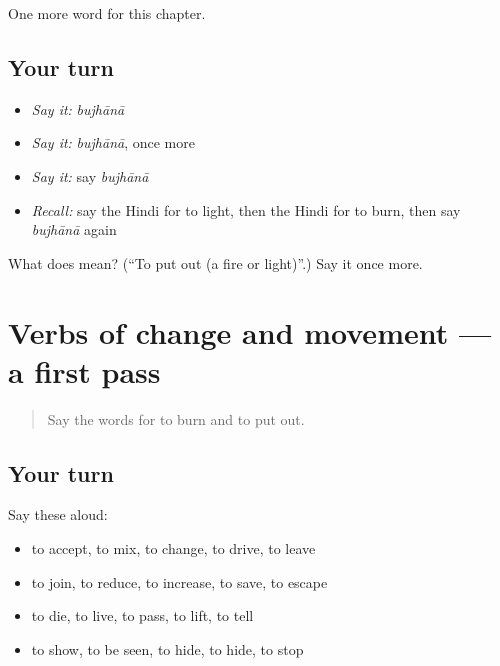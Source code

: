 \begin{grammarlens}[title={What you've built}]
One more word for this chapter.
\end{grammarlens}

\subsection*{Your turn}
\begin{itemize}
\raggedright
  \item \emph{Say it:} \emph{bujhānā}
  \item \emph{Say it:} \emph{bujhānā}, once more
  \item \emph{Say it:} say \emph{bujhānā}
  \item \emph{Recall:} say the Hindi for to light, then the Hindi for to burn, then say \emph{bujhānā} again
\end{itemize}

\begin{tcolorbox}[breakable,colback=teal!4,colframe=teal!35!black,title={Before you move on}]
What does  mean? (\textquotedblleft{}To put out (a fire or light)\textquotedblright{}.) Say it once more.
\end{tcolorbox}
\section[(dialogue)]{Verbs of change and movement — a first pass}

\label{lesson:HI-R175-first-pass-verbs-of-change-and-movement}



\begin{quote}
Say the words for to burn and to put out.
\end{quote}

\subsection*{Your turn}
Say these aloud:

\begin{itemize}
\raggedright
  \item to accept, to mix, to change, to drive, to leave
  \item to join, to reduce, to increase, to save, to escape
  \item to die, to live, to pass, to lift, to tell
  \item to show, to be seen, to hide, to hide, to stop
\end{itemize}

